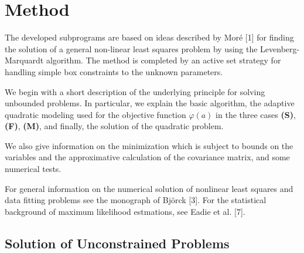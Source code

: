 \chapter{Method}

The developed subprograms are based on ideas described by Mor\'e [1]
for finding the solution of a general non-linear least squares problem
by using the Levenberg-Marquardt algorithm. The method is completed by
an active set strategy for handling simple box constraints to the
unknown parameters.
\par
We begin with a short description of the underlying principle for
solving unbounded problems. In particular, we explain the basic
algorithm, the adaptive quadratic modeling used for the objective
function $\varphi(a)$ in the three cases {\bf (S)}, {\bf (F)}, {\bf (M)},
and finally, the solution of the quadratic problem.
\par
We also give information on the minimization which is subject to
bounds on the variables and the approximative calculation of the
covariance matrix, and some numerical tests.
\par
For general information on
the numerical solution of nonlinear least squares and data fitting
problems see the monograph of Bj\"orck [3]. For the statistical
background of maximum likelihood estmations, see Eadie et al. [7].

\section{Solution of Unconstrained Problems}

